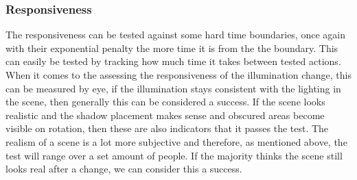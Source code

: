 \documentclass[11pt]{report}
\begin{document}
\subsubsection*{Responsiveness}
The responsiveness can be tested against some hard time boundaries, once again
with their exponential penalty the more time it is from the the boundary. This
can easily be tested by tracking how much time it takes between tested actions.
When it comes to the assessing the responsiveness of the illumination change,
this can be measured by eye, if the illumination stays consistent with the 
lighting in the scene, then generally this can be considered a success. If the
scene looks realistic and the shadow placement makes sense and obscured 
areas become visible on rotation, then these are also indicators that it passes
the test. The realism of a scene is a lot more subjective and therefore, as 
mentioned above, the test will range over a set amount of people. If the majority
thinks the scene still looks real after a change, we can consider this a success.
\end{document}

